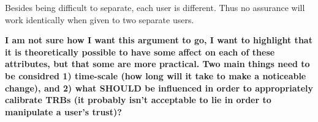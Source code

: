     Besides being difficult to separate, each user is different. Thus no assurance will work identically when given to two separate users.

    \textbf{I am not sure how I want this argument to go, I want to highlight that it is theoretically possible to have some affect on each of these attributes, but that some are more practical. Two main things need to be considred 1) time-scale (how long will it take to make a noticeable change), and 2) what SHOULD be influenced in order to appropriately calibrate TRBs (it probably isn't acceptable to lie in order to manipulate a user's trust)?}
    


